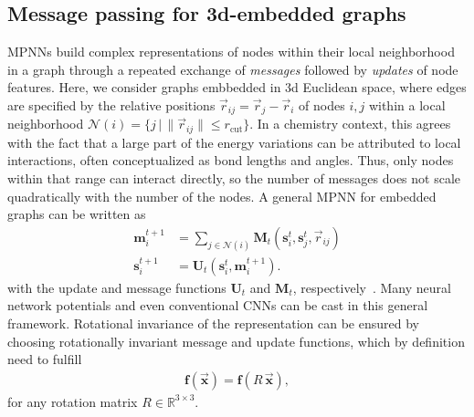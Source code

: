 \documentclass[reprint,
amsmath,amssymb,
 aip,jcp
]{revtex4-2}
\newcommand{\new}[1]{#1}
\begin{document}
\subsection{Message passing for 3d-embedded graphs}
MPNNs build complex representations of nodes within their local neighborhood in a graph through a repeated exchange of \emph{messages} followed by \emph{updates} of node features.
Here, we consider graphs embbedded in 3d Euclidean space, where edges are specified by the relative positions $\vec{r}_{ij} = \vec{r}_j - \vec{r}_i$ of nodes $i, j$ within a local neighborhood $\mathcal{N}(i) = \{ j \, | \, \|\vec{r}_{ij}\| \leq r_\text{cut} \}$.
In a chemistry context, this agrees with the fact that a large part of the energy variations can be attributed to local interactions, often conceptualized as bond lengths and angles.
Thus, only nodes within that range can interact directly, so the number of messages does not scale quadratically with the number of the nodes.
A general MPNN for embedded graphs can be written as
\begin{align}
\mathbf{m}_i^{t+1} &= \sum_{j \in \mathcal{N}(i)} \mathbf{M}_t(\mathbf{s}_i^t, \mathbf{s}_j^t, \vec{r}_{ij}) \\
\mathbf{s}_i^{t+1} &= \mathbf{U}_t \left( \mathbf{s}_i^{t},  \mathbf{m}_i^{t+1}  \right).
\label{eq:mp}
\end{align}
with the update and message functions $\mathbf{U}_t$ and $\mathbf{M}_t$, respectively~\cite{gilmer2017neural}.
Many neural network potentials and even conventional CNNs can be cast in this general framework.
\new{Rotational invariance of the representation can be ensured by choosing rotationally invariant message and update functions, which by definition need to fulfill}
\begin{align}
    \mathbf{f}(\vec{\mathbf{x}}) = \mathbf{f}(R \,\vec{\mathbf{x}}),
\end{align}
\new{for any rotation matrix $R \in \mathbb{R}^{3 \times 3}$.}
\end{document}
